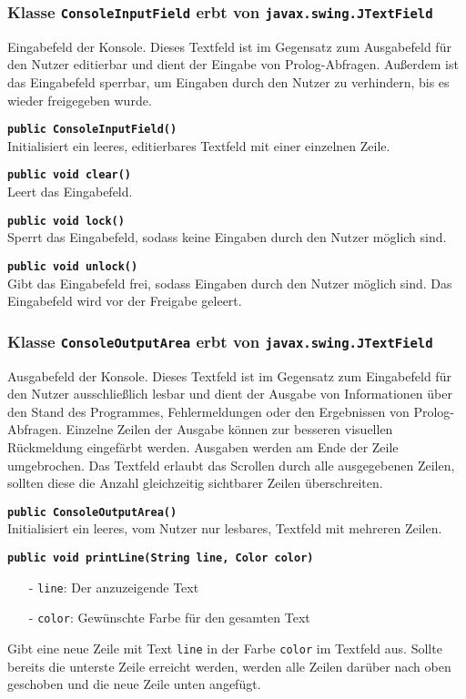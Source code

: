 \documentclass[parskip=full,11pt,twoside]{scrartcl}
\begin{document}
\subsubsection{Klasse \texttt{ConsoleInputField} erbt von \texttt{javax.swing.JTextField}}

Eingabefeld der Konsole. Dieses Textfeld ist im Gegensatz zum Ausgabefeld für den Nutzer editierbar und dient der Eingabe von Prolog-Abfragen. Außerdem ist das Eingabefeld sperrbar, um Eingaben durch den Nutzer zu verhindern, bis es wieder freigegeben wurde.

\textbf{\texttt{public ConsoleInputField()}}\\
Initialisiert ein leeres, editierbares Textfeld mit einer einzelnen Zeile.

\textbf{\texttt{public void clear()}}\\
Leert das Eingabefeld.

\textbf{\texttt{public void lock()}}\\
Sperrt das Eingabefeld, sodass keine Eingaben durch den Nutzer möglich sind.

\textbf{\texttt{public void unlock()}}\\
Gibt das Eingabefeld frei, sodass Eingaben durch den Nutzer möglich sind. Das Eingabefeld wird vor der Freigabe geleert.

\subsubsection{Klasse \texttt{ConsoleOutputArea} erbt von \texttt{javax.swing.JTextField}}

Ausgabefeld der Konsole. Dieses Textfeld ist im Gegensatz zum Eingabefeld für den Nutzer ausschließlich lesbar und dient der Ausgabe von Informationen über den Stand des Programmes, Fehlermeldungen oder den Ergebnissen von Prolog-Abfragen. Einzelne Zeilen der Ausgabe können zur besseren visuellen Rückmeldung eingefärbt werden. Ausgaben werden am Ende der Zeile umgebrochen. Das Textfeld erlaubt das Scrollen durch alle ausgegebenen Zeilen, sollten diese die Anzahl gleichzeitig sichtbarer Zeilen überschreiten.

\textbf{\texttt{public ConsoleOutputArea()}}\\
Initialisiert ein leeres, vom Nutzer nur lesbares, Textfeld mit mehreren Zeilen.

\textbf{\texttt{public void printLine(String line, Color color)}}
\begin{itemize}[noitemsep]
	\item[-] \texttt{line}: Der anzuzeigende Text
	\item[-] \texttt{color}: Gewünschte Farbe für den gesamten Text
\end{itemize}
Gibt eine neue Zeile mit Text \texttt{line} in der Farbe \texttt{color} im Textfeld aus. Sollte bereits die unterste Zeile erreicht werden, werden alle Zeilen darüber nach oben geschoben und die neue Zeile unten angefügt.
\end{document}
